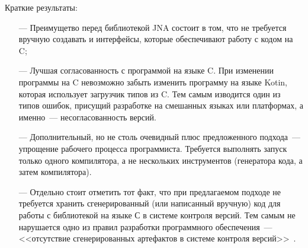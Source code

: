 Краткие результаты:
\begin{itemize}
\item[---] Преимущетво перед библиотекой JNA состоит в том, что не требуется вручную создавать и интерфейсы, которые обеспечивают работу с кодом на C;
\item[---] Лучшая согласованность с программой на языке C. 
  При изменении программы на C невозможно забыть изменить программу на языке Kotin, которая использует загрузчик типов из C.
  Тем самым изводится один из типов ошибок, присущий разработке на смешанных языках или платформах, а именно~--- несогласованность версий.
\item[---] Дополнительный, но не столь очевидный плюс предложенного подхода~--- упрощение рабочего процесса программиста.
  Требуется выполнять запуск только одного компилятора, а не нескольких инструментов (генератора кода, а затем компилятора).
\item[---] Отдельно стоит отметить тот факт, что при предлагаемом подходе не требуется хранить сгенерированный (или написанный вручную) код для работы с библиотекой на языке С в системе контроля версий.
  Тем самым не нарушается одно из правил разработки программного обеспечения~--- <<отсутствие сгенерированных артефактов в системе контроля версий>>~\cite{art-of-agile}.
\end{itemize}